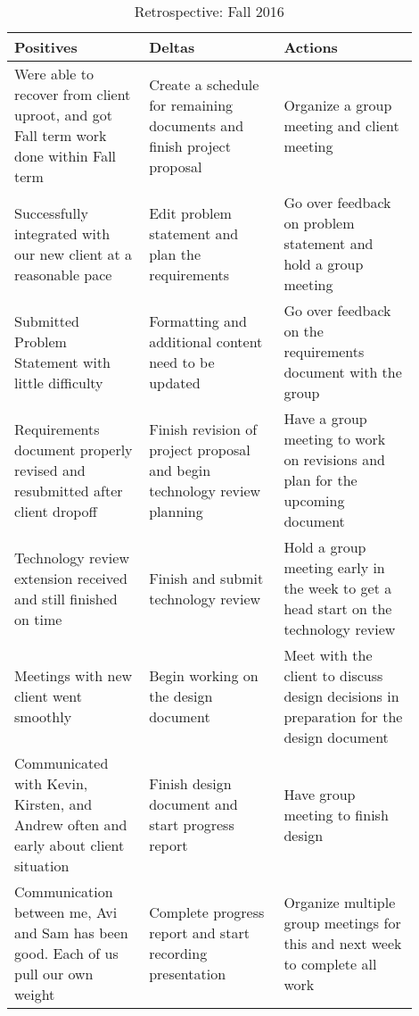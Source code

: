 \documentclass[letterpaper,10pt,titlepage,journal,compsoc,draftclsnofoot,onecolumn]{IEEEtran}
\begin{document}
\begin{table}[H]
			\caption{Retrospective: Fall 2016}
			\begin{center}
				\begin{tabular}{| p{0.3\linewidth} | p{0.3\linewidth} | p{0.3\linewidth} | }
					\hline
					 \textbf{Positives} & \textbf{Deltas} & \textbf{Actions} \\ [0.5ex]
					\hline
					Were able to recover from client uproot, and got Fall term work done within Fall term  & Create a schedule for remaining documents and finish project proposal & Organize a group meeting and client meeting  \\
					\hline
					 Successfully integrated with our new client at a reasonable pace & Edit problem statement and plan the requirements & Go over feedback on problem statement and hold a group meeting \\
					\hline
					 Submitted Problem Statement with little difficulty & Formatting and additional content need to be updated & Go over feedback on the requirements document with the group \\
					\hline
					Requirements document properly revised and resubmitted after client dropoff & Finish revision of project proposal and begin technology review planning & Have a group meeting to work on revisions and plan for the upcoming document\\
					\hline
					Technology review extension received and still finished on time & Finish and submit technology review & Hold a group meeting early in the week to get a head start on the technology review\\
					\hline
					Meetings with new client went smoothly & Begin working on the design document & Meet with the client to discuss design decisions in preparation for the design document  \\
					\hline
					Communicated with Kevin, Kirsten, and Andrew often and early about client situation & Finish design document and start progress report & Have group meeting to finish design \\
					\hline
					Communication between me, Avi and Sam has been good. Each of us pull our own weight & Complete progress report and start recording presentation & Organize multiple group meetings for this and next week to complete all work \\
					\hline

				\end{tabular}
			\end{center}
			\end{table}
\end{document}
